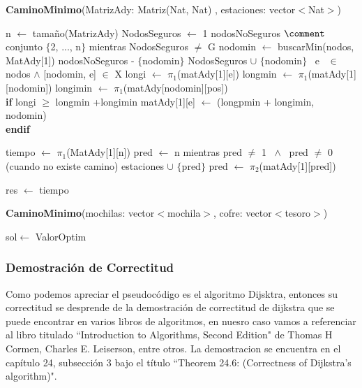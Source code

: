 \documentclass[spanish,12pt]{article}
\begin{document}
\begin{algorithm}[H]{\textbf{CaminoMinimo}(MatrizAdy: Matriz(Nat, Nat) , estaciones: vector$<$Nat$>$)}
	\begin{algorithmic}[1]
		
		\State n $\gets$ tamaño(MatrizAdy)
		\State NodosSeguros $\gets$ 1
		\State nodosNoSeguros $\comment$ conjunto $\{$2, ..., n$\}$
		\State mientras NodosSeguros $\neq$ G
		\State \quad nodomin $\gets$ buscarMin(nodos, MatAdy[1])
		\State \quad nodosNoSeguros - $\{$nodomin$\}$
		\State \quad NodosSeguros $\cup$ $\{$nodomin$\}$
		\State \quad \forall \ e \ $\in$ nodos $\land$ [nodomin, e] $\in$ X
		\State \qquad longi $\gets$ $\pi_{1}$(matAdy[1][e])
		\State \qquad longmin $\gets$ $\pi_{1}$(matAdy[1][nodomin])
		\State \qquad longimin $\gets$ $\pi_{1}$(matAdy[nodomin][pos])
\\
		\qquad \textbf{if} longi $\geq$ longmin +longimin
			\State \qquad \quad matAdy[1][e] $\gets$ (longpmin + longimin, nodomin)
\\		 
 \qquad \textbf{endif}

		\State tiempo $\gets$ $\pi_{1}$(MatAdy[1][n])
		\State pred $\gets$ n
		\State mientras pred $\neq$ 1 \ $\land$ \ pred $\neq$ 0 (cuando no existe camino)
		\State \quad estaciones $\cup$ $\{$pred$\}$
		\State \quad pred $\gets$ $\pi_{2}$(matAdy[1][pred])

		\State res $\gets$ tiempo
 	\end{algorithmic}
\end{algorithm}

\begin{algorithm}[H]{\textbf{CaminoMinimo}(mochilas: vector$<$mochila$>$, cofre: vector$<$tesoro$>$)}
	\begin{algorithmic}[1]
		
		\State sol$\gets$ ValorOptim
	\end{algorithmic}
\end{algorithm}

\newpage

\subsubsection{Demostración de Correctitud}
Como podemos apreciar el pseudocódigo es el algoritmo Dijsktra, entonces su correctitud se desprende de la demostración de correctitud de dijkstra que se puede encontrar en varios libros de algoritmos, en nuesro caso vamos a referenciar al libro titulado ``Introduction to Algorithms, Second Edition"  de Thomas H Cormen, Charles E. Leiserson, entre otros. La demostracion se encuentra en el capítulo 24, subsección 3 bajo el título ``Theorem 24.6: (Correctness of Dijkstra's algorithm)". 
\end{document}
